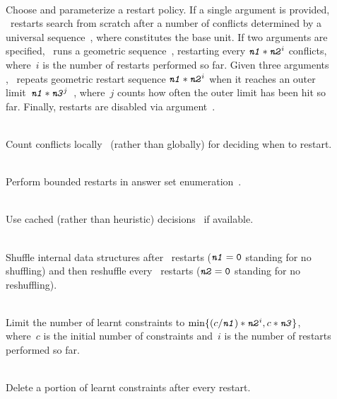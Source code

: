 \begin{description}
\item[]~\\
Choose and parameterize a restart policy.
If a single argument  is provided,
\clasp\ restarts search from scratch after a number of conflicts
determined by a universal sequence~\cite{lusizu93a}, where 
constitutes the base unit.
If two arguments  are specified,
\clasp\ runs a geometric sequence~\cite{eensor03a},
restarting every $\texttt{\textit{n1}}*\texttt{\textit{n2}}^i$ conflicts,
where~$i$ is the number of restarts performed so far.
Given three arguments ,
\clasp\ repeats geometric restart sequence $\texttt{\textit{n1}}*\texttt{\textit{n2}}^i$
when it reaches an outer limit~$\texttt{\textit{n1}}*\texttt{\textit{n3}}^j$~\cite{biere08a},
where~$j$ counts how often the outer limit has been hit so far.
Finally, restarts are disabled via argument~.
\item[]~\\
Count conflicts locally~\cite{ryvstr08a} (rather than globally)
for deciding when to restart.
\item[]~\\
Perform bounded restarts in answer set enumeration~\cite{gekanesc07c}.
\item[]~\\
Use cached (rather than heuristic) decisions~\cite{pipdar07a} if available.
\item[]~\\
Shuffle internal data structures after~ restarts
($\texttt{\textit{n1}}=\texttt{0}$ standing for no shuffling)
and then reshuffle every~ restarts 
($\texttt{\textit{n2}}=\texttt{0}$ standing for no reshuffling).
\item[]~\\
Limit the number of learnt constraints to 
$\min\{(c/\texttt{\textit{n1}})*\texttt{\textit{n2}}^i,c*\texttt{\textit{n3}}\}$,
where~$c$ is the initial number of constraints and~$i$ is the number of restarts
performed so far.
\item[]~\\
Delete a portion of learnt constraints after every restart.
\item[]~\\

\end{description}
